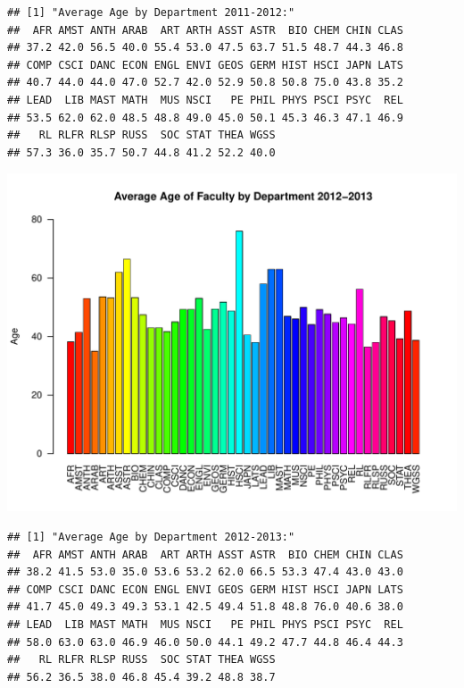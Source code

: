 \documentclass[12pt,a4paper]{article}\usepackage[]{graphicx}\usepackage[]{color}
\makeatletter
\def\maxwidth{ %
  \ifdim\Gin@nat@width>\linewidth
    \linewidth
  \else
    \Gin@nat@width
  \fi
}
\newenvironment{kframe}{%
 \def\at@end@of@kframe{}%
 \ifinner\ifhmode%
  \def\at@end@of@kframe{\end{minipage}}%
  \begin{minipage}{\columnwidth}%
 \fi\fi%
 \def\FrameCommand##1{\hskip\@totalleftmargin \hskip-\fboxsep
 \colorbox{shadecolor}{##1}\hskip-\fboxsep
     \hskip-\linewidth \hskip-\@totalleftmargin \hskip\columnwidth}%
 \MakeFramed {\advance\hsize-\width
   \@totalleftmargin\z@ \linewidth\hsize
   \@setminipage}}%
 {\par\unskip\endMakeFramed%
 \at@end@of@kframe}
\newenvironment{knitrout}{}{} %
\theoremstyle{definition}
\makeatother
\begin{document}
\begin{knitrout}
\begin{kframe}\begin{verbatim}
## [1] "Average Age by Department 2011-2012:"
##  AFR AMST ANTH ARAB  ART ARTH ASST ASTR  BIO CHEM CHIN CLAS 
## 37.2 42.0 56.5 40.0 55.4 53.0 47.5 63.7 51.5 48.7 44.3 46.8 
## COMP CSCI DANC ECON ENGL ENVI GEOS GERM HIST HSCI JAPN LATS 
## 40.7 44.0 44.0 47.0 52.7 42.0 52.9 50.8 50.8 75.0 43.8 35.2 
## LEAD  LIB MAST MATH  MUS NSCI   PE PHIL PHYS PSCI PSYC  REL 
## 53.5 62.0 62.0 48.5 48.8 49.0 45.0 50.1 45.3 46.3 47.1 46.9 
##   RL RLFR RLSP RUSS  SOC STAT THEA WGSS 
## 57.3 36.0 35.7 50.7 44.8 41.2 52.2 40.0
\end{verbatim}
\end{kframe}
\includegraphics[width=\maxwidth]{figure/unnamed-chunk-9-9} 
\begin{kframe}\begin{verbatim}
## [1] "Average Age by Department 2012-2013:"
##  AFR AMST ANTH ARAB  ART ARTH ASST ASTR  BIO CHEM CHIN CLAS 
## 38.2 41.5 53.0 35.0 53.6 53.2 62.0 66.5 53.3 47.4 43.0 43.0 
## COMP CSCI DANC ECON ENGL ENVI GEOS GERM HIST HSCI JAPN LATS 
## 41.7 45.0 49.3 49.3 53.1 42.5 49.4 51.8 48.8 76.0 40.6 38.0 
## LEAD  LIB MAST MATH  MUS NSCI   PE PHIL PHYS PSCI PSYC  REL 
## 58.0 63.0 63.0 46.9 46.0 50.0 44.1 49.2 47.7 44.8 46.4 44.3 
##   RL RLFR RLSP RUSS  SOC STAT THEA WGSS 
## 56.2 36.5 38.0 46.8 45.4 39.2 48.8 38.7
\end{verbatim}
\end{kframe}

\end{knitrout}
\end{document}
